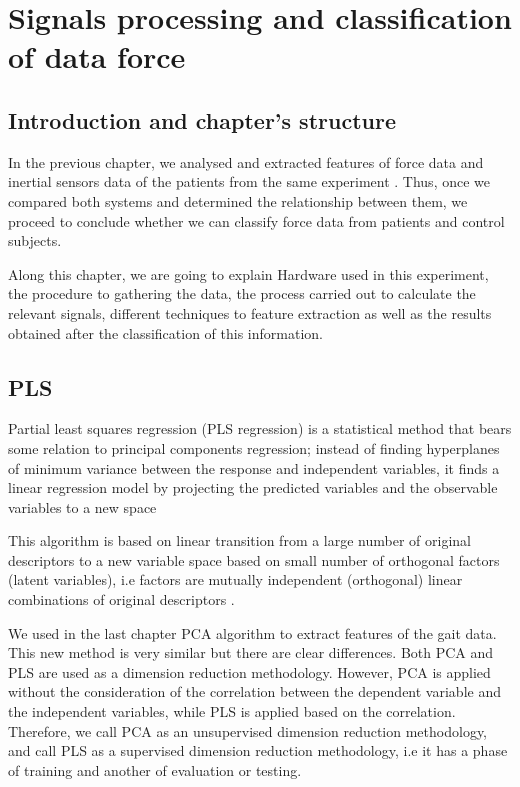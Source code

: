 \chapter{Signals processing and classification of data force}
\label{ch:forceData}

\section{Introduction and chapter's structure}
In the previous chapter, we analysed and extracted features of force data and inertial sensors data of the patients from the same experiment . Thus, once we compared both systems and determined the relationship between them, we proceed to conclude whether we can classify force data from patients and control subjects.

Along this chapter, we are going to explain Hardware used in this experiment, the procedure to gathering the data, the process carried out to calculate the relevant signals, different techniques to feature extraction as well as the results obtained after the classification of this information.

\section{PLS}
Partial least squares regression (PLS regression) is a statistical method that bears some relation to principal components regression; instead of finding hyperplanes of minimum variance between the response and independent variables, it finds a linear regression model by projecting the predicted variables and the observable variables to a new space \cite{pls_pca} 

This algorithm is based on linear transition from a large number of original descriptors to a new variable space based on small number of orthogonal factors (latent variables), i.e factors are mutually independent (orthogonal) linear combinations of original descriptors\cite{pls_pca} .

We used in the last chapter PCA algorithm to extract features of the gait data. This new method is very similar but there are clear differences. Both PCA and PLS are used as a dimension reduction methodology. However, PCA is applied without the consideration of the correlation between the dependent variable and the independent variables, while PLS is applied based on the correlation. Therefore, we call PCA as an unsupervised dimension reduction methodology, and call PLS as a supervised dimension reduction methodology, i.e it has a phase of training and another of evaluation or testing\cite{pls_pca}.

